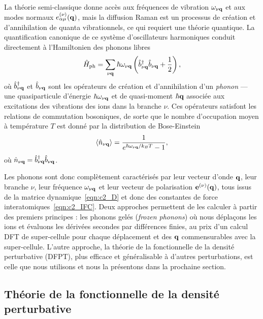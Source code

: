 La théorie semi-classique donne accès aux fréquences de vibration $\omega_{\nu\mathbf{q}}$ et aux modes
normaux $e_{\alpha\mu}^{(\nu)}(\mathbf{q})$, mais la diffusion Raman est un processus de création et d'annihilation de quanta vibrationnels, ce qui requiert une théorie quantique. La quantification canonique de ce système d'oscillateurs harmoniques conduit directement à l'Hamiltonien des phonons libres
\begin{equation}
    \hat{H}_\text{ph}=\sum_{\nu\mathbf{q}}\hbar\omega_{\nu\mathbf{q}}\left(\hat{b}_{\nu\mathbf{q}}^\dag \hat{b}_{\nu\mathbf{q}}+\frac{1}{2}\right),
\end{equation}
où $\hat{b}^\dag_{\nu\mathbf{q}}$ et $\hat{b}_{\nu\mathbf{q}}$ sont les opérateurs de création et d'annihilation d'un \textit{phonon} --- une quasiparticule d'énergie $\hbar\omega_{\nu\mathbf{q}}$ et de quasi-moment $\hbar\mathbf{q}$ associée aux excitations des vibrations des ions dans la branche $\nu$. Ces opérateurs satisfont les relations de commutation bosoniques, de sorte que le nombre d'occupation moyen à température $T$ est donné par la distribution de Bose-Einstein
\begin{equation}
    \langle\hat{n}_{\nu\mathbf{q}}\rangle = \frac{1}{e^{\hbar\omega_{\nu\mathbf{q}}/k_BT}-1},
\end{equation}
où $\hat{n}_{\nu\mathbf{q}}=\hat{b}^\dag_{\nu\mathbf{q}}\hat{b}_{\nu\mathbf{q}}$.

Les phonons sont donc complètement caractérisés par leur vecteur d'onde $\mathbf{q}$, leur branche $\nu$, leur fréquence $\omega_{\nu\mathbf{q}}$ et leur vecteur de polarisation $\mathbf{e}^{(\nu)}(\mathbf{q})$, tous issus de la matrice dynamique~\eqref{eqn:c2_D} et donc des constantes de force interatomiques~\eqref{eqn:c2_IFC}. Deux approches permettent de les calculer à partir des premiers principes : les phonons gelés (\textit{frozen phonons}) où nous déplaçons les ions et évaluons les dérivées secondes par différences finies, au prix d'un calcul DFT de super-cellule pour chaque déplacement et des $\mathbf{q}$ commensurables avec la super-cellule. L'autre approche, la théorie de la fonctionnelle de la densité perturbative (DFPT), plus efficace et généralisable à d'autres perturbations, est celle que nous utilisons et nous la présentons dans la prochaine section.

\clearpage
\subsection{Théorie de la fonctionnelle de la densité perturbative}\label{sec:dfpt}

